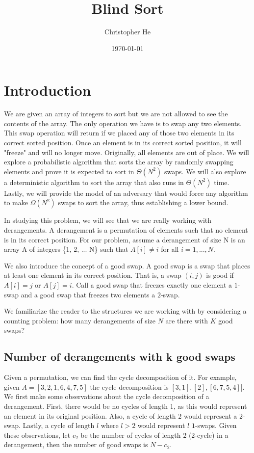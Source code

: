 \documentclass{article}
\title{Blind Sort}
\author{Christopher He}
\date{\today}
\begin{document}
\maketitle
\section{Introduction}

We are given an array of integers to sort but we are not allowed to see the contents of the array.
The only operation we have is to swap any two elements. This swap operation will return if we
placed any of those two elements in its correct sorted position. Once an element is in its correct
sorted position, it will "freeze" and will no longer move. Originally, all elements are out of place.
We will explore a probabilistic algorithm
that sorts the array by randomly swapping elements and prove it is expected to sort in $\Theta(N^2)$ swaps.
We will also explore a deterministic algorithm to sort the array that also runs in $\Theta(N^2)$
time. Lastly, we will provide the model of an adversary that would force any algorithm to make
$\Omega(N^2)$ swaps to sort the array, thus establishing a lower bound.

In studying this problem, we will see that we are really working with derangements. A derangement is
a permutation of elements such that no element is in its correct position. For our problem, assume
a derangement of size N is an array A of integers \{1, 2, ... N\} such that $A[i] \neq i$ for all $i = 1, ..., N$.

We also introduce the concept of a good swap. A good swap is a swap that places at least one element in its correct
position. That is, a swap $(i, j)$ is good if $A[i] = j$ or $A[j] = i$. Call a good swap that freezes exactly one element
a $1$-swap and a good swap that freezes two elements a $2$-swap.

We familiarize the reader to the structures we are working with by considering a counting problem:
how many derangements of size $N$ are there with $K$ good swaps?

\subsection{Number of derangements with k good swaps}
Given a permutation, we can find the cycle decomposition of it. For example, given $A = [3,2,1,6,4,7,5]$
the cycle decomposition is $[3,1],[2],[6,7,5,4]]$. We first make some observations about the cycle
decomposition of a derangement. First, there would be no cycles of length 1, as this would represent
an element in its original position. Also, a cycle of length $2$ would represent a $2$-swap. Lastly, a cycle of length $l$ where
$l > 2$ would represent $l$ $1$-swaps. Given these observations, let $c_2$ be the number of cycles of length $2$ ($2$-cycle)
in a derangement,
then the number of good swaps is $N - c_2$.
\end{document}
